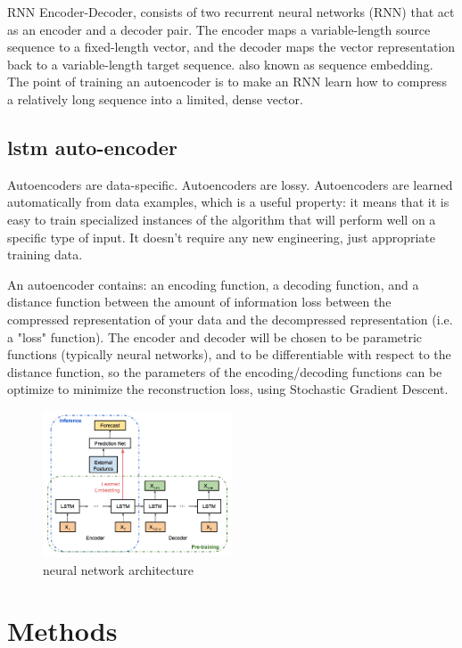 \documentclass[5p]{elsarticle}
\begin{document}
RNN Encoder-Decoder, consists of two recurrent neural networks (RNN) that act as an encoder and a decoder pair. The encoder maps a variable-length source sequence to a fixed-length vector, and the decoder maps the vector representation back to a variable-length target sequence. \cite{ChoLearningTranslation} also known as sequence embedding. The point of training an autoencoder is to make an RNN learn how to compress a relatively long sequence into a limited, dense vector.

\subsection{lstm auto-encoder}
Autoencoders are data-specific. Autoencoders are lossy. Autoencoders are learned automatically from data examples, which is a useful property: it means that it is easy to train specialized instances of the algorithm that will perform well on a specific type of input. It doesn't require any new engineering, just appropriate training data. \cite{BuildingKeras}

An autoencoder contains: an encoding function, a decoding function, and a distance function between the amount of information loss between the compressed representation of your data and the decompressed representation (i.e. a "loss" function). The encoder and decoder will be chosen to be parametric functions (typically neural networks), and to be differentiable with respect to the distance function, so the parameters of the encoding/decoding functions can be optimize to minimize the reconstruction loss, using Stochastic Gradient Descent. 


\begin{figure}[h]
    \centering
    \includegraphics[width=0.5\textwidth]{neural_network_architecture.png}
    \caption{neural network architecture}
    \label{fig:neural_network_architecture}
\end{figure}


\section{Methods}
\end{document}
